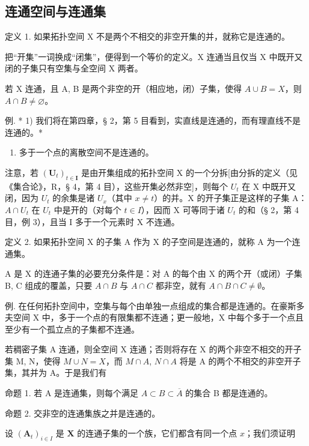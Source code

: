 \subsection{连通空间与连通集}

定义 1. 如果拓扑空间 X 不是两个不相交的非空开集的并，就称它是连通的。

把“开集”一词换成“闭集”，便得到一个等价的定义。X 连通当且仅当 X 中既开又闭的子集只有空集与全空间 X 两者。

若 X 连通，且 A, B 是两个非空的开（相应地，闭）子集，使得 \(A \cup B = X\)，则 \(A \cap B \neq \varnothing\)。

例. * 1) 我们将在第四章，§ 2，第 5 目看到，实直线是连通的，而有理直线不是连通的。*

\begin{enumerate}
\def\labelenumi{\arabic{enumi})}
\setcounter{enumi}{1}
\tightlist
\item
  多于一个点的离散空间不是连通的。
\end{enumerate}

注意，若 \((\mathbf{U}_{t})_{t\in\mathbf{I}}\) 是由开集组成的拓扑空间 X 的一个分拆{[}由分拆的定义（见《集合论》，R，§ 4，第 4 目），这些开集必然非空{]}，则每个 \(U_{t}\) 在 X 中既开又闭，因为 \(U_{t}\) 的余集是诸 \(U_{x}\)（其中 \(x\neq t\)）的并。X 的开子集正是这样的子集 A：\(A\cap U_{t}\) 在 \(U_{t}\) 中是开的（对每个 \(t\in I\)），因而 X 可等同于诸 \(U_{t}\) 的和（§ 2，第 4 目，例 3），且当 I 多于一个元素时 X 不连通。

定义 2. 如果拓扑空间 X 的子集 A 作为 X 的子空间是连通的，就称 A 为一个连通集。

A 是 X 的连通子集的必要充分条件是：对 A 的每个由 X 的两个开（或闭）子集 B, C 组成的覆盖，只要 \(A \cap B\) 与 \(A \cap C\) 都非空，就有 \(A \cap B \cap C \neq \emptyset\)。

例. 在任何拓扑空间中，空集与每个由单独一点组成的集合都是连通的。在豪斯多夫空间 X 中，多于一个点的有限集都不连通；更一般地，X 中每个多于一个点且至少有一个孤立点的子集都不连通。

若稠密子集 A 连通，则全空间 X 连通；否则将存在 X 的两个非空不相交的开子集 M, N，使得 \(M \cup N = X\)，而 \(M \cap A\), \(N \cap A\) 将是 A 的两个不相交的非空开子集，其并为 A。于是我们有

命题 1. 若 A 是连通集，则每个满足 \(A \subset B \subset \overline{A}\) 的集合 B 都是连通的。

命题 2. 交非空的连通集族之并是连通的。

设 \((\mathbf{A}_t)_{i\in I}\) 是 \(\mathbf{X}\) 的连通子集的一个族，它们都含有同一个点 \(x\)；我们须证明

